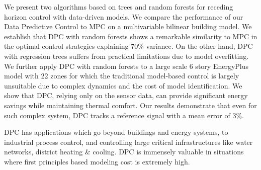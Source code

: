 
We present two algorithms based on trees and random forests for receding horizon control with data-driven models. 
We compare the performance of our Data Predictive Control to MPC on a multivariable bilinear building model. We establish that DPC with random forests shows a remarkable similarity to MPC in the optimal control strategies explaining 70\% variance. On the other hand, DPC with regression trees suffers from practical limitations due to model overfitting.
We further apply DPC with random forests to a large scale 6 story EnergyPlus model with 22 zones for which the traditional model-based control is largely unsuitable due to complex dynamics and the cost of model identification. We show that DPC, relying only on the sensor data, can provide significant energy savings while maintaining thermal comfort. Our results demonstrate that even for such complex system, DPC tracks a reference signal with a mean error of 3\%.

DPC has applications which go beyond buildings and energy systems, to industrial process control, and controlling large critical infrastructures like water networks, district heating \& cooling. DPC is immensely valuable in situations where first principles based modeling cost is extremely high.